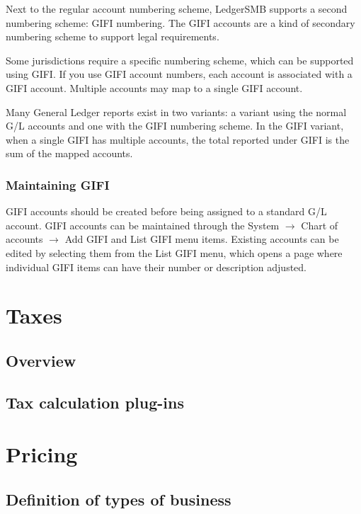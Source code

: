 \documentclass[10pt,A4]{book}
\begin{document}
Next to the regular account numbering scheme, LedgerSMB supports a second numbering scheme: GIFI numbering. The GIFI accounts are a kind of secondary numbering scheme to support legal requirements.

Some jurisdictions require a specific numbering scheme, which can be supported using GIFI. If you
use GIFI account numbers, each account is associated with a GIFI account. Multiple accounts may map
to a single GIFI account.

Many General Ledger reports exist in two variants: a variant using the normal G/L accounts and
one with the GIFI numbering scheme. In the GIFI variant, when a single GIFI has multiple accounts,
the total reported under GIFI is the sum of the mapped accounts.


\subsection{Maintaining GIFI}

GIFI accounts should be created before being assigned to a standard G/L account. GIFI accounts
can be maintained through the System $\rightarrow$ Chart of accounts $\rightarrow$ Add GIFI and List GIFI menu items. Existing accounts can be edited by selecting them from the List GIFI menu, which opens a page where individual GIFI items can have their number or
description adjusted.


\chapter{Taxes}
\label{cha:Taxes}

\section{Overview}



\section{Tax calculation plug-ins}
\label{sec:TaxRulePlugins}

\chapter{Pricing}

\section{Definition of types of business}
\end{document}
